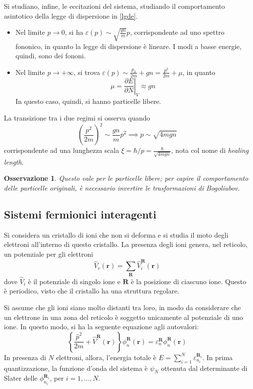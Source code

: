 \documentclass[11pt, a4paper]{scrartcl}
\theoremstyle{style}
\newtheorem{osservazione}{Osservazione}[section]
\theoremstyle{style1}
\newcommand*\Eval[3]{\left.#1\right\rvert_{#2}^{#3}}
\numberwithin{equation}{subsection}
\begin{document}
Si studiano, infine, le eccitazioni del sistema, studiando il comportamento asintotico della legge di dispersione in \ref{lgde}.
\begin{itemize}
	\item Nel limite $p\to 0$, si ha $\varepsilon (p) \sim \sqrt{\frac{gn}{m}} p$, corrispondente ad uno spettro fononico, in quanto la legge di dispersione \`e lineare. 
		I modi a basse energie, quindi, sono dei fononi.
	\item Nel limite $p\to +\infty$, si trova $\varepsilon (p) \sim \frac{p_2}{2m} + gn = \frac{p^2}{2m} + \mu $, in quanto 
		\[
			\mu  = \Eval{\frac{\partial E}{\partial N} }{V}{} \approx gn
		\] 
		In questo caso, quindi, si hanno particelle libere.
\end{itemize}
La transizione tra i due regimi si osserva quando 
\[
\left(\frac{p^2}{2m}\right) ^2 \sim \frac{gn}{m}p^2 \implies p \sim \sqrt{4 mgn} 
\] 
corrispondente ad una lunghezza scala $\xi = \hbar  / p  = \frac{\hbar }{\sqrt{4mgn} }$, nota col nome di \textit{healing length}.
\begin{osservazione}
Questo vale per le particelle libere; per capire il comportamento delle particelle originali, \`e necessario invertire le trasformazioni di Bogoliubov.
\end{osservazione}
\subsection{Sistemi fermionici interagenti}
Si considera un cristallo di ioni che non si deforma e si studia il moto degli elettroni all'interno di questo cristallo.
La presenza degli ioni genera, nel reticolo, un potenziale per gli elettroni
\[
\hat{V}_r(\mathbf{r} )  = \sum_{\mathbf{R} }^{} \hat{V}_i^{\mathbf{R} } (\mathbf{r} )
\] 
dove $\hat{V}_i$ \`e il potenziale di singolo ione e $\mathbf{R} $ \`e la posizione di ciascuno ione.
Questo \`e periodico, visto che il cristallo ha una struttura regolare. 

Si assume che gli ioni siano molto distanti tra loro, in modo da considerare che un elettrone in una zona del reticolo \`e soggetto unicamente al potenziale di uno ione.
In questo modo, si ha la seguente equazione agli autovalori:
\[
\left\{ \frac{\hat{p}^2}{2m} + \hat{V}^\mathbf{R} (\mathbf{r} ) \right\} \phi _n^\mathbf{R}  (\mathbf{r} ) = \varepsilon _n^\mathbf{R} \phi _n^\mathbf{R} (\mathbf{r} )
\] 
In presenza di $N$ elettroni, allora, l'energia totale \`e $E = \sum_{i=1}^{N} \varepsilon _{n_i} ^{\mathbf{R} _i}$.
In prima quantizzazione, la funzione d'onda del sistema \`e $\psi _N$ ottenuta dal determinante di Slater delle $\phi _{n_i} ^{\mathbf{R} _i} $, per $i=1,\ldots,N$.
\end{document}
